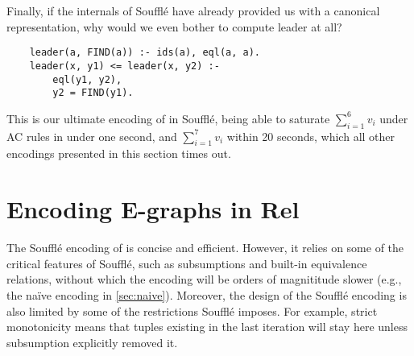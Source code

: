 
Finally, if the internals of Souffl\'e have already provided us 
 with a canonical representation,
 why would we even bother to compute leader at all?
\begin{verbatim}
    leader(a, FIND(a)) :- ids(a), eql(a, a).
    leader(x, y1) <= leader(x, y2) :-
        eql(y1, y2),
        y2 = FIND(y1).
\end{verbatim}

This is our ultimate encoding of \egraphs in Souffl\'e, being able to saturate 
 \(\sum_{i=1}^6 v_i\) under AC rules in under one second, 
 and \(\sum_{i=1}^7 v_i\) within 20 seconds, 
 which all other encodings presented in this section times out.

\section{Encoding E-graphs in Rel}\label{section/rel}

The Souffl\'e encoding of \egraphs is concise and efficient.
However, it relies on some of the critical features of Souffl\'e,
 such as subsumptions and built-in equivalence relations,
 without which the encoding will be orders of magnititude slower 
 (e.g., the na\"ive encoding in \autoref{sec:naive}).
Moreover, the design of the Souffl\'e encoding is also limited 
 by some of the restrictions Souffl\'e imposes.
For example,
 strict monotonicity means that tuples existing in the last iteration
 will stay here unless subsumption explicitly removed it.


